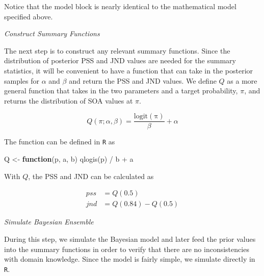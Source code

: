 \documentclass[11pt, oneside, openany]{scrbook}
\newenvironment{Shaded}{\begin{snugshade}}{\end{snugshade}}
\newcommand{\ControlFlowTok}[1]{\textcolor[rgb]{0.13,0.29,0.53}{\textbf{#1}}}
\newcommand{\FunctionTok}[1]{\textcolor[rgb]{0.00,0.00,0.00}{#1}}
\newcommand{\NormalTok}[1]{#1}
\newcommand{\OtherTok}[1]{\textcolor[rgb]{0.56,0.35,0.01}{#1}}
\newcommand{\SpecialCharTok}[1]{\textcolor[rgb]{0.00,0.00,0.00}{#1}}
\begin{document}

Notice that the model block is nearly identical to the mathematical model specified above.

\emph{Construct Summary Functions}

The next step is to construct any relevant summary functions. Since the distribution of posterior PSS and JND values are needed for the summary statistics, it will be convenient to have a function that can take in the posterior samples for \(\alpha\) and \(\beta\) and return the PSS and JND values. We define \(Q\) as a more general function that takes in the two parameters and a target probability, \(\pi\), and returns the distribution of SOA values at \(\pi\).

\begin{equation}
  Q(\pi; \alpha, \beta) = \frac{\mathrm{logit(\pi)}}{\beta} + \alpha
  \label{eq:summfun1}
\end{equation}

The function can be defined in \texttt{R} as

\begin{Shaded}
\begin{Highlighting}[]
\NormalTok{Q }\OtherTok{\textless{}{-}} \ControlFlowTok{function}\NormalTok{(p, a, b) }\FunctionTok{qlogis}\NormalTok{(p) }\SpecialCharTok{/}\NormalTok{ b }\SpecialCharTok{+}\NormalTok{ a}
\end{Highlighting}
\end{Shaded}

With \(Q\), the PSS and JND can be calculated as


\begin{align*}
  pss &= Q(0.5) \\
  jnd &= Q(0.84) - Q(0.5)
\end{align*}

\emph{Simulate Bayesian Ensemble}

During this step, we simulate the Bayesian model and later feed the prior values into the summary functions in order to verify that there are no inconsistencies with domain knowledge. Since the model is fairly simple, we simulate directly in \texttt{R}.

\end{document}
